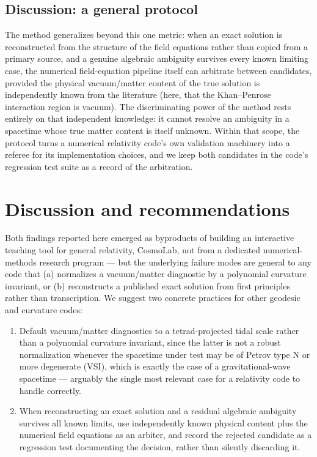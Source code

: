 \documentclass[aps,onecolumn,10pt,nofootinbib]{revtex4-2}
\begin{document}
\subsection{Discussion: a general protocol}

The method generalizes beyond this one metric: when an exact solution is
reconstructed from the structure of the field equations rather than copied
from a primary source, and a genuine algebraic ambiguity survives every
known limiting case, the numerical field-equation pipeline itself can
arbitrate between candidates, provided the physical vacuum/matter content
of the true solution is independently known from the literature (here,
that the Khan--Penrose interaction region is vacuum). The discriminating
power of the method rests entirely on that independent knowledge: it
cannot resolve an ambiguity in a spacetime whose true matter content is
itself unknown. Within that scope, the protocol turns a numerical
relativity code's own validation machinery into a referee for its
implementation choices, and we keep both candidates in the code's
regression test suite as a record of the arbitration.

\section{Discussion and recommendations}

Both findings reported here emerged as byproducts of building an
interactive teaching tool for general relativity, CosmoLab, not from a
dedicated numerical-methods research program — but the underlying failure
modes are general to any code that (a) normalizes a vacuum/matter
diagnostic by a polynomial curvature invariant, or (b) reconstructs a
published exact solution from first principles rather than transcription.
We suggest two concrete practices for other geodesic and curvature codes:

\begin{enumerate}
  \item Default vacuum/matter diagnostics to a tetrad-projected tidal
  scale rather than a polynomial curvature invariant, since the latter
  is not a robust normalization whenever the spacetime under test may be
  of Petrov type N or more degenerate (VSI), which is exactly the case
  of a gravitational-wave spacetime — arguably the single most relevant
  case for a relativity code to handle correctly.
  \item When reconstructing an exact solution and a residual algebraic
  ambiguity survives all known limits, use independently known physical
  content plus the numerical field equations as an arbiter, and record
  the rejected candidate as a regression test documenting the decision,
  rather than silently discarding it.
\end{enumerate}
\end{document}
